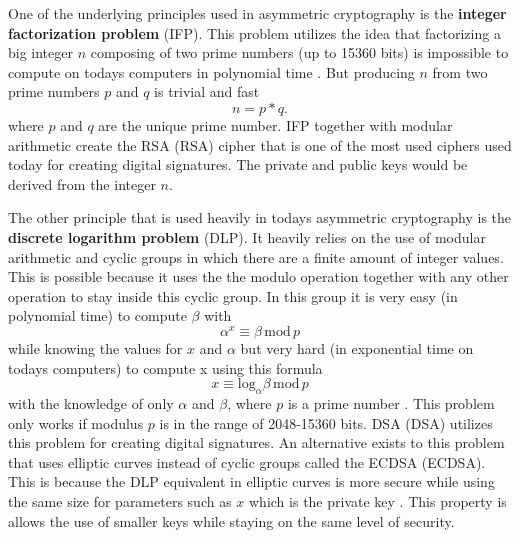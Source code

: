 One of the underlying principles used in asymmetric cryptography is the \textbf{integer factorization problem} (\acs{IFP}). This problem utilizes the idea that factorizing a big integer $n$ composing of two prime numbers (up to 15360 bits) is impossible to compute on todays computers in polynomial time \cite{Paar2010}. But producing $n$ from two prime numbers $p$ and $q$ is trivial and fast
\begin{equation}
  n=p*q.
\end{equation}
where $p$ and $q$ are the unique prime number. IFP together with modular arithmetic create the RSA (\acl{RSA}) cipher that is one of the most used ciphers used today for creating digital signatures. The private and public keys would be derived from the integer $n$.

The other principle that is used heavily in todays asymmetric cryptography is the \textbf{discrete logarithm problem} (\acs{DLP}). It heavily relies on the use of modular arithmetic and cyclic groups in which there are a finite amount of integer values. This is possible because it uses the the modulo operation together with any other operation to stay inside this cyclic group. In this group it is very easy (in polynomial time) to compute $\beta$ with
\begin{equation}
  \alpha^x\equiv\beta\,\mathrm{mod}\,p
\end{equation}
while knowing the values for $x$ and $\alpha$ but very hard (in exponential time on todays computers) to compute x using this formula
\begin{equation}
  x\equiv\mathrm{log}_\alpha\beta\,\mathrm{mod}\,p
\end{equation}
with the knowledge of only $\alpha$ and $\beta$, where $p$ is a prime number \cite{Paar2010}. This problem only works if modulus $p$ is in the range of 2048-15360 bits. DSA (\acl{DSA}) utilizes this problem for creating digital signatures. An alternative exists to this problem that uses elliptic curves instead of cyclic groups called the \acl{ECDSA} (ECDSA). This is because the DLP equivalent in elliptic curves is more secure while using the same size for parameters such as $x$ which is the private key \cite{Ristic2014}. This property is allows the use of smaller keys while staying on the same level of security.
